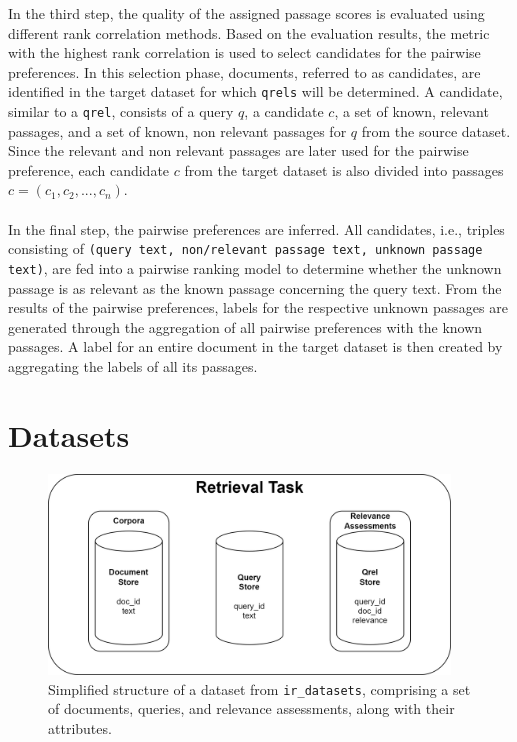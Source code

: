 In the third step, the quality of the assigned passage scores is evaluated using different rank correlation methods. Based on the evaluation results, the metric with the highest rank correlation is used to select candidates for the pairwise preferences. In this selection phase, documents, referred to as candidates, are identified in the target dataset for which \texttt{qrels} will be determined. A candidate, similar to a \texttt{qrel}, consists of a query $q$, a candidate $c$, a set of known, relevant passages, and a set of known, non relevant passages for $q$ from the source dataset. Since the relevant and non relevant passages are later used for the pairwise preference, each candidate $c$ from the target dataset is also divided into passages $c=(c_1, c_2, ..., c_n)$.
\\\\
In the final step, the pairwise preferences are inferred. All candidates, i.e., triples consisting of \texttt{(query text, non/relevant passage text, unknown passage text)}, are fed into a pairwise ranking model to determine whether the unknown passage is as relevant as the known passage concerning the query text. From the results of the pairwise preferences, labels for the respective unknown passages are generated through the aggregation of all pairwise preferences with the known passages. A label for an entire document in the target dataset is then created by aggregating the labels of all its passages.

\pagebreak


\section{Datasets}\label{datasets}

\begin{figure}[ht]
    \centering
    \includegraphics[width=0.95\textwidth]{./graphics/drawio/datasets.png}
    \caption{Simplified structure of a dataset from \texttt{ir\_datasets}, comprising a set of documents, queries, and relevance assessments, along with their attributes.}
\end{figure}

